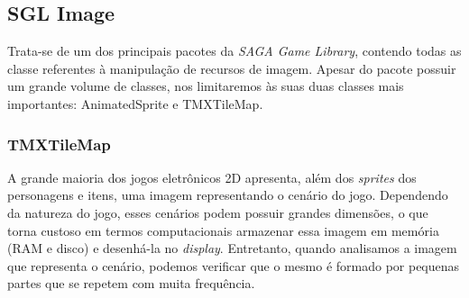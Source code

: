\subsection{SGL Image}
%
Trata-se de um dos principais pacotes da \textit{SAGA Game Library}, contendo todas as classe referentes à manipulação de recursos de imagem. Apesar do pacote possuir um grande volume de classes, nos limitaremos às suas duas classes mais importantes: AnimatedSprite e TMXTileMap.
%
%
%
\subsubsection{TMXTileMap}
%
%
%
A grande maioria dos jogos eletrônicos 2D apresenta, além dos \textit{sprites} dos personagens e itens, uma imagem representando o cenário do jogo. Dependendo da natureza do jogo, esses cenários podem possuir grandes dimensões, o que torna custoso em termos computacionais armazenar essa imagem em memória (RAM e disco) e desenhá-la no \textit{display}. Entretanto, quando analisamos a imagem que representa o cenário, podemos verificar que o mesmo é formado por pequenas partes que se repetem com muita frequência. 

